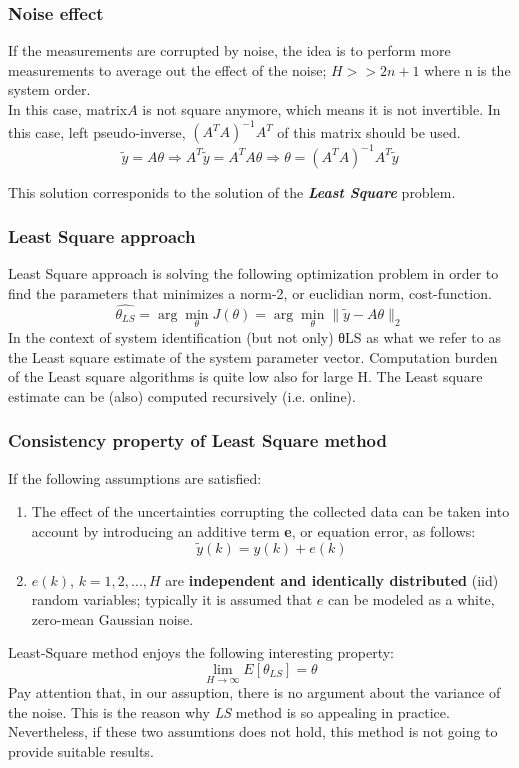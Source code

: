 \subsubsection{Noise effect}
If the measurements are corrupted by noise, the idea is to perform more measurements to average out the effect of the noise; \(H >> 2n + 1\) where n is the system order.\\

In this case, matrix\(A\) is not square anymore, which means it is not invertible. In this case, left pseudo-inverse, \((A^TA)^{-1}A^T\) of this matrix should be used.\\

\[
\tilde{y} = A \theta
\Rightarrow
A^T\tilde{y} = A^TA \theta
\Rightarrow
\theta = (A^TA)^{-1}A^T\tilde{y}
\]

This solution corresponids to the solution of the \textbf{\textit{Least Square}} problem.

\subsubsection{Least Square approach}

Least Square approach is solving the following optimization problem in order to find the parameters that minimizes a norm-2, or euclidian norm, cost-function.
\begin{equation}
    \hat{\theta_{LS}} = \arg \min \limits_{\theta} J(\theta) = \arg \min \limits_{\theta} \|\tilde{y} - A \theta\|_2
\end{equation}
In the context of system identification (but not only) θLS as what we refer to as
the Least square estimate of the system parameter vector. Computation burden of the Least square algorithms is quite low also for large H. The Least square estimate can be (also) computed recursively (i.e. online).
\newpage
\subsubsection{Consistency property of Least Square method}

If the following assumptions are satisfied:
\begin{enumerate}
\item The effect of the uncertainties corrupting the collected data can be taken into
account by introducing an additive term \textbf{e}, or equation error, as follows:
\[\tilde{y}(k) = y(k) + e(k)\]
\item  \(e(k)\), \(k = 1, 2, . . . , H\) are \textbf{independent and identically distributed} (iid) random
variables; typically it is assumed that \(e\) can be modeled as a white, zero-mean
Gaussian noise.
\end{enumerate}
Least-Square method enjoys the following interesting property:
\begin{equation}
\lim\limits_{H \to \infty} E[\theta_{LS}] = \theta
\end{equation}
Pay attention that, in our assuption, there is no argument about the variance of the noise. This is the reason why \textit{LS} method is so appealing in practice. Nevertheless, if these two assumtions does not hold, this method is not going to provide suitable results.


